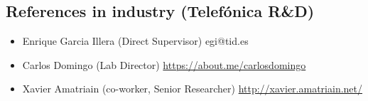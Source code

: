 \documentclass[11pt,a4paper,sans]{moderncv}        %
\begin{document}
\subsection{References in industry (Telefónica R\&D)}
\begin{itemize}
\item Enrique Garcia Illera (Direct Supervisor) \hfill egi@tid.es 
\item Carlos Domingo (Lab Director) \hfill \url{https://about.me/carlosdomingo}
\item Xavier Amatriain (co-worker, Senior Researcher) \hfill \url{http://xavier.amatriain.net/}
\end{itemize}
\end{document}
